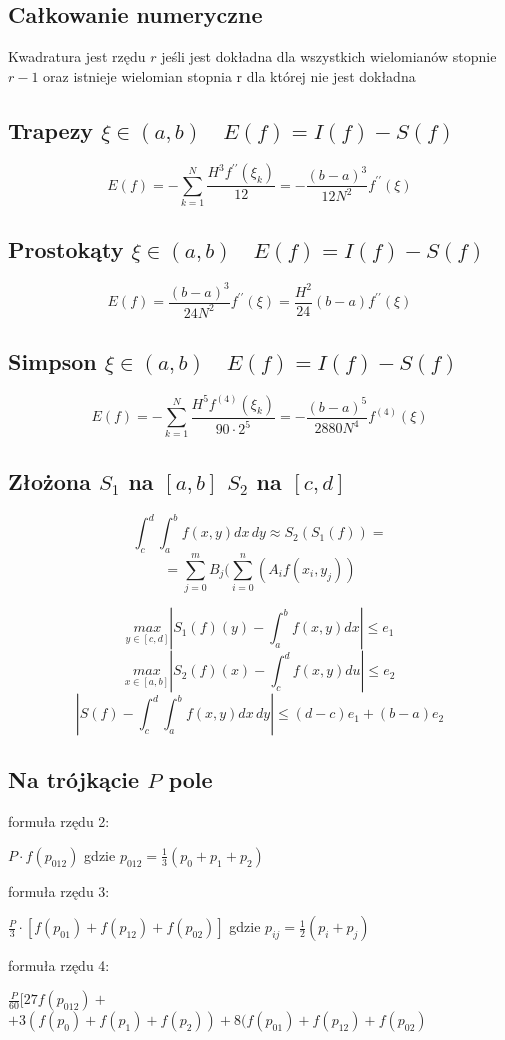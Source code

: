 \documentclass[twocolumn]{article}
\begin{document}
\begin{flushleft}
\thispagestyle{empty} %

\section{Całkowanie numeryczne}
Kwadratura jest rzędu $r$ jeśli jest dokładna dla wszystkich wielomianów stopnie $r-1$ oraz istnieje wielomian stopnia r dla której nie jest dokładna\\
\subsection{Trapezy $\xi \in \left(a,b\right) \quad E(f) = I(f) - S(f)$}
$$E(f) = -\sum_{k=1}^{N}\frac{H^3f^{\prime\prime}(\xi_k)}{12} =- \frac{(b-a)^3}{12N^2}f^{\prime\prime}(\xi)$$
\subsection{Prostokąty $\xi \in \left(a,b\right) \quad E(f) = I(f) - S(f)$}
$$E(f) = \frac{(b-a)^3}{24N^2}f^{\prime\prime}(\xi) = \frac{H^2}{24}(b-a) f^{\prime\prime}(\xi)$$
\subsection{Simpson $\xi \in \left(a,b\right) \quad E(f) = I(f) - S(f)$}
$$E(f)= -\sum_{k=1}^N \frac{H^5f^{(4)}(\xi_k)}{90\cdot2^5} =- \frac{(b-a)^5}{2880N^4}f^{(4)}(\xi) $$%
\subsection{Złożona $S_1$ na $[a,b]$ $S_2$ na $[c,d]$}
$$\int_c^d\int_a^b f(x,y) dx\, dy \approx S_2(S_1(f)) =$$
$$=\sum_{j=0}^m B_j (\sum_{i=0}^n(A_i f(x_i,y_j))$$

$$\underset{y\in[c,d]}{max} \left| S_1(f)(y) - \int_a^bf(x,y)dx \right| \leq e_1$$
$$\underset{x\in[a,b]}{max} \left| S_2(f)(x) - \int_c^df(x,y)du \right| \leq e_2$$
$$\left| S(f) - \int_c^d\int_a^b f(x,y) dx \,dy \right| \leq (d-c) e_1 + (b-a) e_2$$
\subsection{Na trójkącie $P$ pole}
formuła rzędu 2:
\begin{center}
$P\cdot f(p_{012})$ gdzie $p_{012} = \frac{1}{3}(p_0+p_1+p_2)$
\end{center}
formuła rzędu 3:
\begin{center}
$\frac{P}{3}\cdot \left[f(p_{01})+f(p_{12})+f(p_{02})\right]$ gdzie $p_{ij} = \frac{1}{2}(p_i+p_j)$
\end{center}
formuła rzędu 4:
\begin{center}
$\frac{P}{60}[ 27f(p_{012})+$\\$ + 3(f(p_0)+f(p_1)+f(p_2)) + 8(f(p_{01})+f(p_{12})+f(p_{02})$
\end{center}


\end{flushleft}
\end{document}

